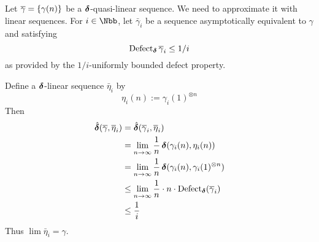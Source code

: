 \begin{Proof}
	Let $\overline\gamma=\left\{\gamma(n)\right\}$ be a $\operatorname{{\bm\delta}}$-quasi-linear
	sequence. We need to approximate it with linear sequences. For
	$i\in\Nbb$, let
	$\bar\gamma_{i}$ be a sequence asymptotically equivalent to $\gamma$
	and satisfying
	\[
	\operatorname{\mathrm{Defect}}_{\operatorname{{\bm\delta}}}\overline\gamma_{i}\leq 1/i
	\]
	as provided by the $1/i$-uniformly bounded defect property.
	
	Define a $\operatorname{{\bm\delta}}$-linear sequence $\bar\eta_{i}$ by
	\[
	\eta_{i}(n):=\gamma_{i}(1)^{\otimes n}
	\]
	Then
	\begin{align*}
	\operatorname{\hat{\bm\delta}}(\overline\gamma,\overline\eta_{i})
	&=
	\operatorname{\hat{\bm\delta}}(\overline\gamma_{i},\overline\eta_{i})
	\\
	&=
	\lim_{n\stackrel{}{\rightarrow}\infty}
	\frac1n
	\operatorname{{\bm\delta}}(\gamma_{i}(n),\eta_{i}(n))
	\\
	&=
	\lim_{n\stackrel{}{\rightarrow}\infty}
	\frac1n
	\operatorname{{\bm\delta}}(\gamma_{i}(n),\gamma_{i}(1)^{\otimes n})
	\\
	&\leq
	\lim_{n\stackrel{}{\rightarrow}\infty}
	\frac1n
	\cdot n\cdot\operatorname{\mathrm{Defect}}_{\operatorname{{\bm\delta}}}(\overline\gamma_{i})
	\\
	&\leq
	\frac1i    
	\end{align*}
	Thus $\lim\bar\eta_{i}=\gamma$.
\end{Proof}






